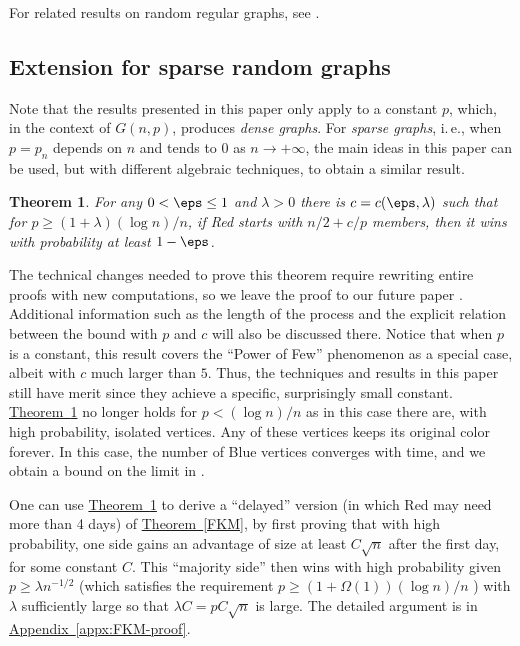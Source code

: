 \documentclass[11pt]{article}
\numberwithin{equation}{section}
\newtheorem{theorem}{Theorem}[section]
\theoremstyle{definition}
\theoremstyle{plain}
\newcommand{\ie}{i.\,e.}
\newcommand{\expref}[2]{\hyperref[#2]{#1~\ref{#2}}}
\begin{document}
			For related results on random regular graphs, see \cite{mossel2014, mossel2017}.
			
			
			\subsection{Extension for sparse random graphs}
			
			Note that the results presented in this paper only %
			apply to  %
			a constant $p$, which, in the context of $G(n, p)$, produces \emph{dense graphs}. For \emph{sparse graphs}, \ie, when $p = p_n$ depends on $n$ and tends to $0$ as $n \to +\infty$, the main ideas in this paper can be used, but with different algebraic techniques, to obtain a similar result.
			
			\begin{theorem} \label{thm:general-sparse}
				For any $0< \eps \le 1$ and $\lambda > 0$ there is $c = c (\eps, \lambda)$ such that for $p \ge (1 + \lambda) (\log n)/n$,
				if Red starts with $n/2 + c/p$ members, then it wins with probability at least $1 -\eps$.
			\end{theorem}
			
			The technical changes needed to prove this theorem require rewriting entire proofs with new computations, so we leave the proof to our future paper \cite{TranVusparse}. Additional information such as the length of the process and the explicit relation between the bound with $p$ and $c$ will also be discussed there.
			Notice that when $p$ is a constant, this result covers the ``Power of Few'' phenomenon as a special case, albeit with $c$ much larger than $5$. Thus, the techniques and results in this paper still have merit since they achieve a specific, surprisingly small constant.
			\expref{Theorem}{thm:general-sparse} no longer holds for $p < (\log n)/n$ as in this case there are, with high probability, isolated vertices. Any of these vertices  keeps %
			its  %
			original color forever. In this case, the number of Blue vertices  converges with time, and we obtain a bound on the limit in \cite{TranVusparse}.
			
			One can use  \expref{Theorem}{thm:general-sparse} to derive a ``delayed'' version  (in which Red may need more than 4 days) of \expref{Theorem}{FKM}, by first proving that with high probability, one side gains an advantage of size at least $C\sqrt{n}$ after the first day, for some constant $C$. This ``majority side'' then wins with high probability given $p \ge \lambda n^{-1/2}$ (which satisfies the requirement  %
			$p \ge (1 + \Omega(1))(\log n)/n$%
			) with $\lambda$ sufficiently large so that $\lambda C = pC\sqrt{n}$ is large. The detailed argument is in \expref{Appendix}{appx:FKM-proof}.
			
\end{document}
